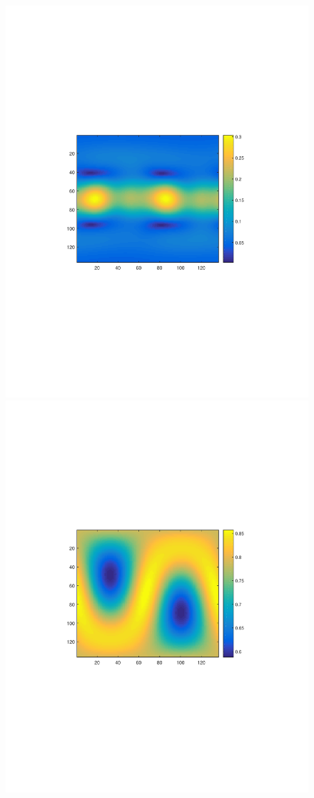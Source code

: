 \documentclass{UCF_ETD}
\begin{document}
\begin{figure}[H]
\begin{center}
\includegraphics[scale=0.41]{RobustRegistration/SphericalImage3}
\includegraphics[scale=0.41]{RobustRegistration/SphericalImage1Rotated}

\end{center}
\end{figure}
\end{document}
